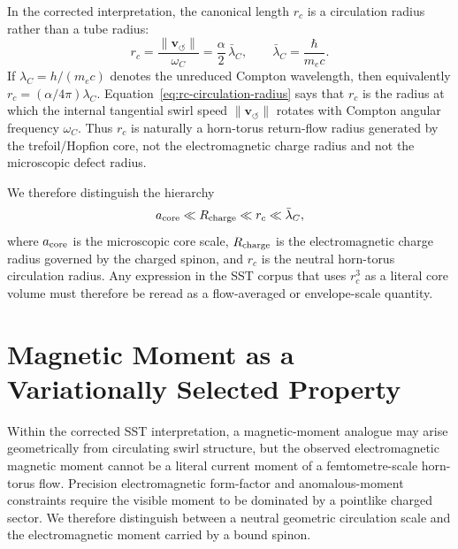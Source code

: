 \documentclass[pdflatex,sn-mathphys-num]{sn-jnl}
\theoremstyle{thmstyleone}
\theoremstyle{thmstyletwo}
\theoremstyle{thmstylethree}
\newcommand{\vswirl}{\mathbf{v}_{\!\boldsymbol{\circlearrowleft}}}
\newcommand{\rc}{r_c}
\newcommand{\lambdabarC}{\bar{\lambda}_C}
\begin{document}
        In the corrected interpretation, the canonical length $\rc$ is a circulation radius rather than a tube radius:
        \begin{equation}
            \rc = \frac{\lVert\vswirl\rVert}{\omega_C}
            = \frac{\alpha}{2}\,\lambdabarC,
            \qquad
            \lambdabarC=\frac{\hbar}{m_ec}.
            \label{eq:rc-circulation-radius}
        \end{equation}
        If $\lambda_C=h/(m_ec)$ denotes the unreduced Compton wavelength, then equivalently $\rc=(\alpha/4\pi)\lambda_C$. Equation~\eqref{eq:rc-circulation-radius} says that $\rc$ is the radius at which the internal tangential swirl speed $\lVert\vswirl\rVert$ rotates with Compton angular frequency $\omega_C$. Thus $\rc$ is naturally a horn-torus return-flow radius generated by the trefoil/Hopfion core, not the electromagnetic charge radius and not the microscopic defect radius.

        We therefore distinguish the hierarchy
        \begin{equation}
            a_{\rm core} \ll R_{\rm charge} \ll \rc \ll \lambdabarC,
            \label{eq:scale-hierarchy}
        \end{equation}
        where $a_{\rm core}$ is the microscopic core scale, $R_{\rm charge}$ is the electromagnetic charge radius governed by the charged spinon, and $\rc$ is the neutral horn-torus circulation radius. Any expression in the SST corpus that uses $\rc^3$ as a literal core volume must therefore be reread as a flow-averaged or envelope-scale quantity.

    \section{Magnetic Moment as a Variationally Selected Property}
        \label{sec:variational}

        Within the corrected SST interpretation, a magnetic-moment analogue may arise geometrically from circulating swirl structure, but the observed electromagnetic magnetic moment cannot be a literal current moment of a femtometre-scale horn-torus flow. Precision electromagnetic form-factor and anomalous-moment constraints require the visible moment to be dominated by a pointlike charged sector. We therefore distinguish between a neutral geometric circulation scale and the electromagnetic moment carried by a bound spinon.
\end{document}
